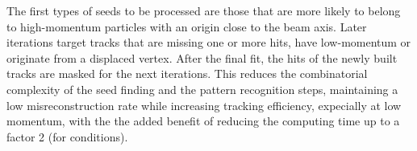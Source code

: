 The first types of seeds to be processed are those that are more likely to belong to high-momentum particles with an origin close to the beam axis.
Later iterations target tracks that are missing one or more hits, have low-momentum or originate from a displaced vertex.
After the final fit, the hits of the newly built tracks are masked for the next iterations.
This reduces the combinatorial complexity of the seed finding and the pattern recognition steps,
maintaining a low misreconstruction rate while increasing tracking efficiency, expecially at low momentum,
with the the added benefit of reducing the computing time up to a factor 2 (for \RunII conditions).

